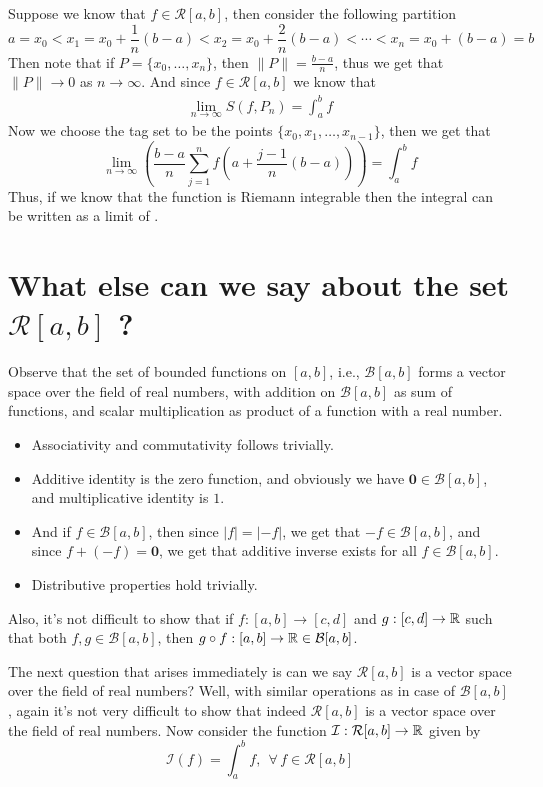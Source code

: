 Suppose we know that $f \in \mathcal{R}[a,b]$, then consider the following partition \[ a = x_0 < x_1 = x_0 + \frac{1}{n}(b-a) < x_2 = x_0 + \frac{2}{n}(b-a) < \cdots < x_n = x_0 + (b-a) = b \]
Then note that if $P = \{x_0,\dots,x_n\}$, then $\|P\| = \frac{b-a}{n}$, thus we get that $\|P\| \to 0$ as $n \to \infty$. And since $f \in \mathcal{R}[a,b]$ we know that 
\begin{align*}
    \lim_{n\to\infty} S(f,P_n) = \int_a^b f
\end{align*}
Now we choose the tag set to be the points $\{x_0,x_1,\dots,x_{n-1}\}$, then we get that 
\begin{equation}\label{eq6:feb4}
    \lim_{n\to\infty}\left(\frac{b-a}{n}\sum_{j=1}^n f \left(a+\frac{j-1}{n}(b-a) \right)\right) = \int_a^b f
\end{equation}
Thus, if we know that the function is Riemann integrable then the integral can be written as a limit of .

\section{What else can we say about the set $\mathcal{R}[a,b]$ ?}

Observe that the set of bounded functions on $[a,b]$, i.e., $\mathcal{B}[a,b]$ forms a vector space over the field of real numbers, with addition on $\mathcal{B}[a,b]$ as sum of functions, and scalar multiplication as product of a function with a real number. 
\begin{itemize}
    \item Associativity and commutativity follows trivially.
    \item Additive identity is the zero function, and obviously we have $\mathbf{0} \in \mathcal{B}[a,b]$, and multiplicative identity is $1$.
    \item And if $f \in \mathcal{B}[a,b]$, then since $|f| = |-f|$, we get that $-f \in \mathcal{B}[a,b]$, and since $f + (-f) = \mathbf{0}$, we get that additive inverse exists for all $f \in \mathcal{B}[a,b]$.
    \item Distributive properties hold trivially.
\end{itemize} 
Also, it's not difficult to show that if $f : [a,b] \to [c,d]$ and $g : [c,d] \to \mathbb{R}$ such that both $f,g \in \mathcal{B}[a,b]$, then $g \circ f : [a,b] \to \mathbb{R} \in \mathcal{B}[a,b]$.

The next question that arises immediately is can we say $\mathcal{R}[a,b]$ is a vector space over the field of real numbers? Well, with similar operations as in case of $\mathcal{B}[a,b]$, again it's not very difficult to show that indeed $\mathcal{R}[a,b]$ is a vector space over the field of real numbers. Now consider the function $\mathcal{I} : \mathcal{R}[a,b] \to \mathbb{R}$ given by 
\begin{equation}\label{eq7:feb4}
    \mathcal{I}(f) = \int_a^b f, \ \ \forall \, f \in \mathcal{R}[a,b]
\end{equation}

